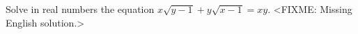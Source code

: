 \problem
Solve in real numbers the equation $x \sqrt{y - 1} + y \sqrt{x - 1} = x y$. 
\solution
<FIXME: Missing English solution.>
\endproblem

